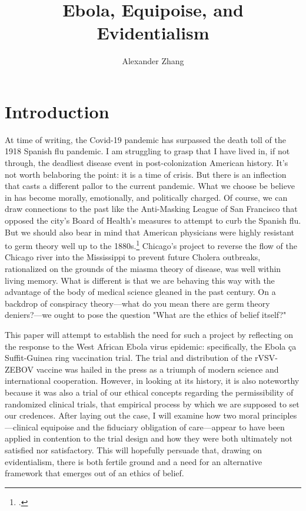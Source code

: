 \documentclass[letterpaper,notitlepage,12pt]{article}
\title{Ebola, Equipoise, and Evidentialism}
\author{Alexander Zhang}
\begin{document}
\maketitle



\section{Introduction}

At time of writing, the Covid-19 pandemic has surpassed the death toll of
the 1918 Spanish flu pandemic.
I am struggling to grasp that I have lived in, if not through, the deadliest
disease event in post-colonization American history.
It's not worth belaboring the point: it is a time of crisis.
But there is an inflection that casts a different pallor to the current
pandemic.
What we choose be believe in has become morally, emotionally, and politically
charged.
Of course, we can draw connections to the past like the Anti-Masking League of
San Francisco that opposed the city's Board of Health's measures to attempt to
curb the Spanish flu.
But we should also bear in mind that American physicians were highly resistant
to germ theory well up to the 1880s.\footcite{Tomes1997}
Chicago's project to reverse the flow of the Chicago river into the Mississippi
to prevent future Cholera outbreaks, rationalized on the grounds of the miasma
theory of disease, was well within living memory.
What is different is that we are behaving this way with the advantage of the
body of medical science gleaned in the past century.
On a backdrop of conspiracy theory---what do you mean there are germ theory
deniers?---we ought to pose the question "What are the ethics of belief itself?"

This paper will attempt to establish the need for such a project by reflecting 
on the response to the West African Ebola virus epidemic: specifically, the 
Ebola \c{c}a Suffit-Guinea ring vaccination trial.
The trial and distribution of the rVSV-ZEBOV vaccine was hailed in the press as
a triumph of modern science and international cooperation.
However, in looking at its history, it is also noteworthy because it was also a
trial of our ethical concepts regarding the permissibility of randomized
clinical trials, that empirical process by which we are supposed to set our
credences.
After laying out the case, I will examine how two moral principles---clinical
equipoise and the fiduciary obligation of care---appear to have been applied in
contention to the trial design and how they were both ultimately not satisfied
nor satisfactory.
This will hopefully persuade that, drawing on evidentialism, there is both
fertile ground and a need for an alternative framework that emerges out of an
ethics of belief.
\end{document}
